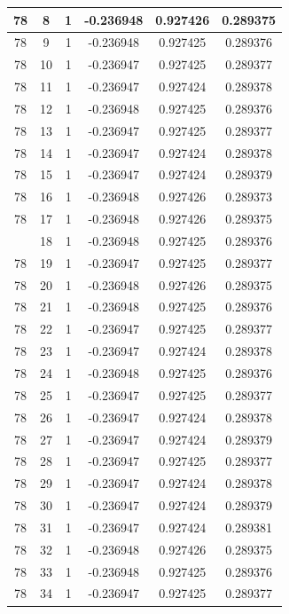 \documentclass[12pt,a4paper]{article}
\numberwithin{equation}{section}
\numberwithin{figure}{section}
\numberwithin{table}{section}
\begin{document}
\begin{longtable}{|c|c|c|c|c|c|}
78 & 8 & 1 & -0.236948 & 0.927426 & 0.289375 \\ \hline
78 & 9 & 1 & -0.236948 & 0.927425 & 0.289376 \\ \hline
78 & 10 & 1 & -0.236947 & 0.927425 & 0.289377 \\ \hline
78 & 11 & 1 & -0.236947 & 0.927424 & 0.289378 \\ \hline
78 & 12 & 1 & -0.236948 & 0.927425 & 0.289376 \\ \hline
78 & 13 & 1 & -0.236947 & 0.927425 & 0.289377 \\ \hline
78 & 14 & 1 & -0.236947 & 0.927424 & 0.289378 \\ \hline
78 & 15 & 1 & -0.236947 & 0.927424 & 0.289379 \\ \hline
78 & 16 & 1 & -0.236948 & 0.927426 & 0.289373 \\ \hline
78 & 17 & 1 & -0.236948 & 0.927426 & 0.289375 \\ \hline
\pagebreak
78 & 18 & 1 & -0.236948 & 0.927425 & 0.289376 \\ \hline
78 & 19 & 1 & -0.236947 & 0.927425 & 0.289377 \\ \hline
78 & 20 & 1 & -0.236948 & 0.927426 & 0.289375 \\ \hline
78 & 21 & 1 & -0.236948 & 0.927425 & 0.289376 \\ \hline
78 & 22 & 1 & -0.236947 & 0.927425 & 0.289377 \\ \hline
78 & 23 & 1 & -0.236947 & 0.927424 & 0.289378 \\ \hline
78 & 24 & 1 & -0.236948 & 0.927425 & 0.289376 \\ \hline
78 & 25 & 1 & -0.236947 & 0.927425 & 0.289377 \\ \hline
78 & 26 & 1 & -0.236947 & 0.927424 & 0.289378 \\ \hline
78 & 27 & 1 & -0.236947 & 0.927424 & 0.289379 \\ \hline
78 & 28 & 1 & -0.236947 & 0.927425 & 0.289377 \\ \hline
78 & 29 & 1 & -0.236947 & 0.927424 & 0.289378 \\ \hline
78 & 30 & 1 & -0.236947 & 0.927424 & 0.289379 \\ \hline
78 & 31 & 1 & -0.236947 & 0.927424 & 0.289381 \\ \hline
78 & 32 & 1 & -0.236948 & 0.927426 & 0.289375 \\ \hline
78 & 33 & 1 & -0.236948 & 0.927425 & 0.289376 \\ \hline
78 & 34 & 1 & -0.236947 & 0.927425 & 0.289377 \\ \hline

\end{longtable}
\end{document}
